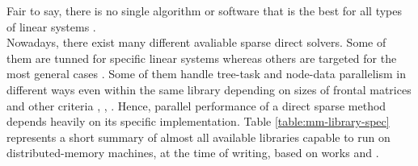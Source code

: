 \label{subseq:mm-library-choice}

Fair to say, there is no single algorithm or software that is the best for all types of linear systems \cite{list-of-sparse-direct-solvers}.\\


Nowadays, there exist many different avaliable sparse direct solvers. Some of them are tunned for specific linear systems whereas others are targeted for the most general cases \cite{list-of-sparse-direct-solvers}. Some of them handle tree-task and node-data parallelism in different ways even within the same library depending on sizes of frontal matrices and other criteria \cite{wsmp}, \cite{mumps-manual}, \cite{superlu-manual}. Hence, parallel performance of a direct sparse method depends heavily on its specific implementation. Table \ref{table:mm-library-spec} represents a short summary of almost all available libraries capable to run on distributed-memory machines, at the time of writing, based on works \cite{list-of-sparse-direct-solvers} and \cite{petsc-web-page}.\\


